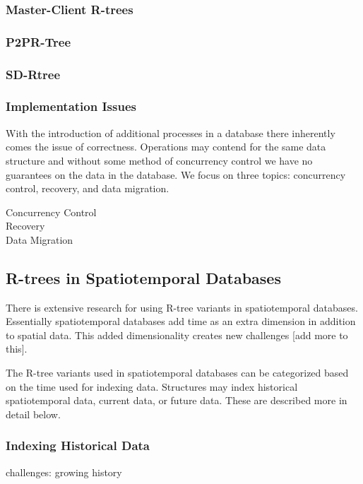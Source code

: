 \subsubsection{Master-Client R-trees}
\cite{schnitzer1999master}

\subsubsection{P2PR-Tree}
\cite{mondal2005p2pr}

\subsubsection{SD-Rtree}
\cite{du2007sd}

\subsubsection{Implementation Issues}
With the introduction of additional processes in a database there inherently
comes the issue of correctness. Operations may contend for the same data 
structure and without some method of concurrency control we have no guarantees
on the data in the database. We focus on three topics: concurrency control,
recovery, and data migration. 

\begin{description}
	\item[Concurrency Control]
	\item[Recovery]
	\item[Data Migration]
\end{description}

\subsection{R-trees in Spatiotemporal Databases}
There is extensive research for using R-tree variants in spatiotemporal
databases. Essentially spatiotemporal databases add time as an extra dimension
in addition to spatial data. This added dimensionality creates new challenges
[add more to this]. 

The R-tree variants used in spatiotemporal databases can be categorized based
on the time used for indexing data. Structures may index historical 
spatiotemporal data, current data, or future data. These are described more
in detail below.

\subsubsection{Indexing Historical Data}
challenges: growing history


